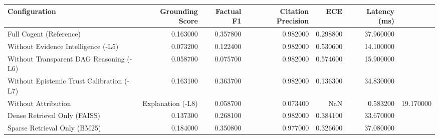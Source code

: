\begin{tabular}{lrrrrr}
\toprule
Configuration & Grounding Score & Factual F1 & Citation Precision & ECE & Latency (ms) \\
\midrule
Full Cogent (Reference) & 0.163000 & 0.357800 & 0.982000 & 0.298800 & 37.960000 \\
Without Evidence Intelligence (-L5) & 0.073200 & 0.122400 & 0.982000 & 0.530600 & 14.100000 \\
Without Transparent DAG Reasoning (-L6) & 0.058700 & 0.075700 & 0.982000 & 0.574600 & 15.900000 \\
Without Epistemic Trust Calibration (-L7) & 0.163100 & 0.363700 & 0.982000 & 0.136300 & 34.830000 \\
Without Attribution & Explanation (-L8) & 0.058700 & 0.073400 & NaN & 0.583200 & 19.170000 \\
Dense Retrieval Only (FAISS) & 0.137300 & 0.268100 & 0.982000 & 0.384100 & 33.670000 \\
Sparse Retrieval Only (BM25) & 0.184000 & 0.350800 & 0.977000 & 0.326600 & 37.080000 \\
\bottomrule
\end{tabular}
